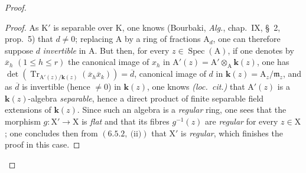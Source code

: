 \begin{proof}
\begin{proof}
As $\mathrm{K}'$ is separable over $\mathrm{K}$, one knows (Bourbaki, \emph{Alg.}, chap.~IX, \S~2, prop.~5)
that $d\neq 0$; replacing $\mathrm{A}$ by a ring of fractions $\mathrm{A}_d$, one can therefore suppose $d$
\emph{invertible} in $\mathrm{A}$. But then, for every $z\in\operatorname{Spec}(\mathrm{A})$, if one denotes by $\overline{x}_h$ $(1\leqslant h\leqslant r)$
the canonical image of $x_h$ in $\mathrm{A}'(z)=\mathrm{A}'\otimes_\mathrm{A}\boldsymbol{k}(z)$, one has $\det(\operatorname{Tr}_{\mathrm{A}'(z)/\boldsymbol{k}(z)}(\overline{x}_h\overline{x}_k))=\overline{d}$, canonical
image of $d$ in $\boldsymbol{k}(z)=\mathrm{A}_z/\mathfrak{m}_z$, and as $\overline{d}$ is invertible (hence $\neq 0$) in $\boldsymbol{k}(z)$, one
knows \emph{(loc.~cit.)} that $\mathrm{A}'(z)$ is a $\boldsymbol{k}(z)$-algebra \emph{separable}, hence a direct product of finite separable field
extensions of $\boldsymbol{k}(z)$. Since such an algebra is a \emph{regular} ring, one sees
that the morphism $g:\mathrm{X}'\to\mathrm{X}$ is \emph{flat} and that its fibres $g^{-1}(z)$ are \emph{regular} for every
$z\in\mathrm{X}$; one concludes then from $(6.5.2,~\text{(ii)})$ that $\mathrm{X}'$ is \emph{regular}, which finishes the proof in this case.
\end{proof}


\end{proof}
